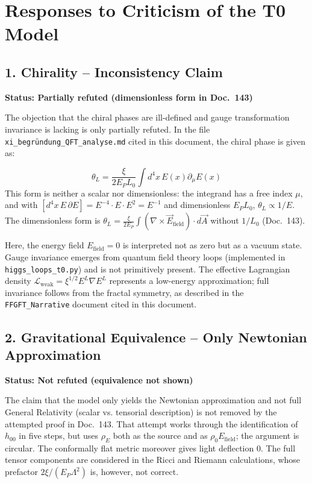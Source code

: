 \section{Responses to Criticism of the T0 Model}
	
	\subsection{1. Chirality – Inconsistency Claim}
	\textbf{Status: Partially refuted (dimensionless form in Doc.~143)}
	
	The objection that the chiral phases are ill-defined and gauge transformation invariance is lacking is only partially refuted. In the file \texttt{xi\_begründung\_QFT\_analyse.md} cited in this document, the chiral phase is given as:
	
	\[
	\theta_L = \frac{\xi}{2E_P L_0} \int d^4x\, E(x) \partial_\mu E(x)
	\]
	This form is neither a scalar nor dimensionless: the integrand has a free index $\mu$, and with $[d^4x\,E\,\partial E] = E^{-4}\cdot E\cdot E^2 = E^{-1}$ and dimensionless $E_P L_0$, $\theta_L \propto 1/E$. The dimensionless form is $\theta_L = \frac{\xi}{2E_P}\int (\nabla \times \vec{E}_{\text{field}}) \cdot d\vec{A}$ without $1/L_0$ (Doc.~143).
	
	Here, the energy field \(E_{\text{field}} = 0\) is interpreted not as zero but as a vacuum state. Gauge invariance emerges from quantum field theory loops (implemented in \texttt{higgs\_loops\_t0.py}) and is not primitively present. The effective Lagrangian density \(\mathcal{L}_{\text{weak}} = \xi^{1/2} E^L \nabla E^L\) represents a low-energy approximation; full invariance follows from the fractal symmetry, as described in the \texttt{FFGFT\_Narrative} document cited in this document.
	
	\subsection{2. Gravitational Equivalence – Only Newtonian Approximation}
	\textbf{Status: Not refuted (equivalence not shown)}
	
	The claim that the model only yields the Newtonian approximation and not full General Relativity (scalar vs. tensorial description) is not removed by the attempted proof in Doc.~143. That attempt works through the identification of \(h_{00}\) in five steps, but uses \(\rho_E\) both as the source and as \(\rho_0 E_{\text{field}}\); the argument is circular. The conformally flat metric moreover gives light deflection $0$. The full tensor components are considered in the Ricci and Riemann calculations, whose prefactor $2\xi/(E_P\Lambda^2)$ is, however, not correct.
	
